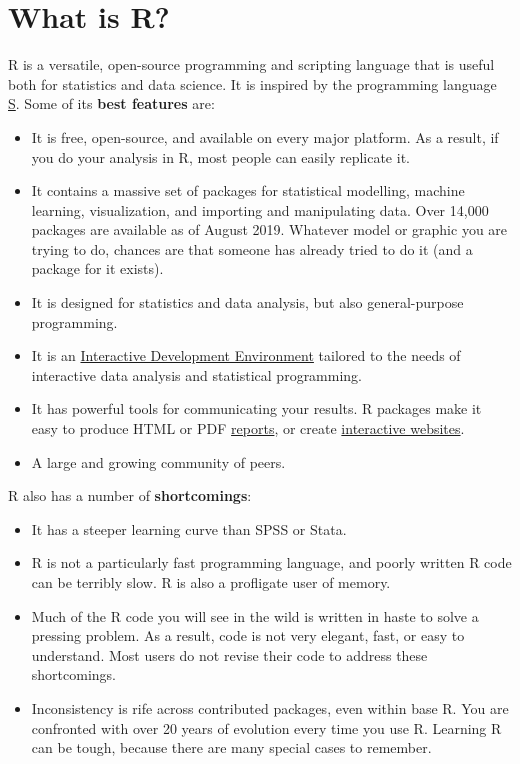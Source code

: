 \documentclass[]{book}
\begin{document}
\hypertarget{what-is-r}{\section{What is R?}\label{what-is-r}}

R is a versatile, open-source programming and scripting language that is
useful both for statistics and data science. It is inspired by the
programming language
\href{https://en.wikipedia.org/wiki/S_(programming_language)}{S}. Some
of its \textbf{best features} are:

\begin{itemize}
\item
  It is free, open-source, and available on every major platform. As a
  result, if you do your analysis in R, most people can easily replicate
  it.
\item
  It contains a massive set of packages for statistical modelling,
  machine learning, visualization, and importing and manipulating data.
  Over 14,000 packages are available as of August 2019. Whatever model
  or graphic you are trying to do, chances are that someone has already
  tried to do it (and a package for it exists).
\item
  It is designed for statistics and data analysis, but also
  general-purpose programming.
\item
  It is an \href{http://www.rstudio.com/ide/}{Interactive Development
  Environment} tailored to the needs of interactive data analysis and
  statistical programming.
\item
  It has powerful tools for communicating your results. R packages make
  it easy to produce HTML or PDF
  \href{http://yihui.name/knitr/}{reports}, or create
  \href{http://www.rstudio.com/shiny/}{interactive websites}.
\item
  A large and growing community of peers.
\end{itemize}

R also has a number of \textbf{shortcomings}:

\begin{itemize}
\item
  It has a steeper learning curve than SPSS or Stata.
\item
  R is not a particularly fast programming language, and poorly written
  R code can be terribly slow. R is also a profligate user of memory.
\item
  Much of the R code you will see in the wild is written in haste to
  solve a pressing problem. As a result, code is not very elegant, fast,
  or easy to understand. Most users do not revise their code to address
  these shortcomings.
\item
  Inconsistency is rife across contributed packages, even within base R.
  You are confronted with over 20 years of evolution every time you use
  R. Learning R can be tough, because there are many special cases to
  remember.
\end{itemize}
\end{document}

